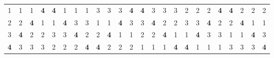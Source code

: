 \def\n{\textbf{4}}

\begin{tabular}{cccc|cccc|cccc|cccc|cccc|cccc}
1& 1&1 &\n&\n&1 &1 &1 &3 &3 &3 &\n&\n&3 &3 &3 &2 &2 &2 &\n&\n&2 &2 &2 \\
2& 2&\n&1 &1 &\n&3 &3 &1 &1 &\n&3 &3 &\n&2 &2 &3 &3 &\n&2 &2 &\n&1 &1 \\
3&\n&2 &2 &3 &3 &\n&2 &2 &\n&1 &1 &2 &2 &\n&1 &1 &\n&3 &3 &1 &1 &\n&3 \\
\n&3&3 &3 &2 &2 &2 &\n&\n&2 &2 &2 &1 &1 &1 &\n&\n&1 &1 &1 &3 &3 &3 &\n
\end{tabular}
